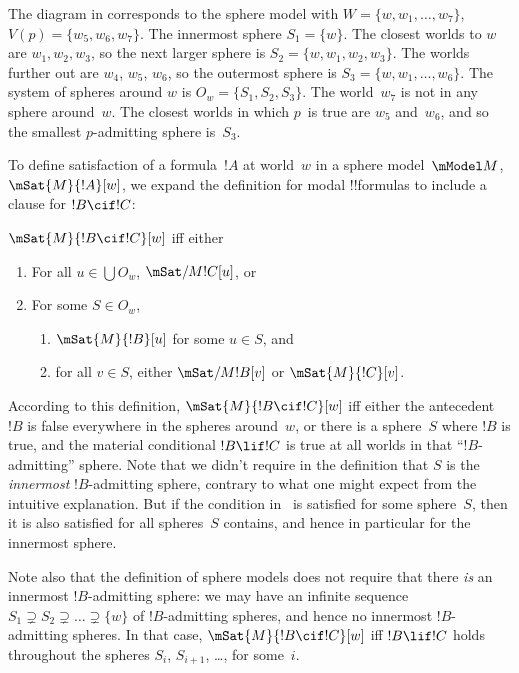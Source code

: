 \documentclass[../../../include/open-logic-section]{subfiles}
\begin{document}
The diagram in  corresponds to the sphere
model with $W = \{w, w_1, \dots, w_7\}$, $V(p) = \{w_5, w_6,
w_7\}$. The innermost sphere $S_1 = \{w\}$. The closest worlds to $w$
are $w_1, w_2, w_3$, so the next larger sphere is $S_2 = \{w, w_1,
w_2, w_3\}$. The worlds further out are $w_4$, $w_5$, $w_6$, so the
outermost sphere is $S_3 = \{w, w_1, \dots, w_6\}$. The system of
spheres around $w$ is $O_w = \{S_1, S_2, S_3\}$. The world~$w_7$ is
not in any sphere around~$w$. The closest worlds in which $p$~is true
are $w_5$ and~$w_6$, and so the smallest $p$-admitting sphere
is~$S_3$.

To define satisfaction of a formula~$!A$ at world~$w$ in a sphere
model~$\mModel M$, $\mSat{M}{!A}[w]$, we expand the definition for
modal !!{formula}s to include a clause for $!B \cif !C$:

\begin{defn}
  $\mSat{M}{!B \cif !C}[w]$ iff either
  \begin{enumerate}
  \item{} For all $u \in \bigcup O_w$, $\mSat/{M}{!C}[u]$, or
  \item{} For some $S \in O_w$,
    \begin{enumerate}
      \item $\mSat{M}{!B}[u]$ for some $u \in
        S$, and
      \item for all $v \in S$, either
        $\mSat/{M}{!B}[v]$ or $\mSat{M}{!C}[v]$.
    \end{enumerate}
  \end{enumerate}
\end{defn}

According to this definition, $\mSat{M}{!B \cif !C}[w]$ iff either the
antecedent~$!B$ is false everywhere in the spheres around~$w$, or
there is a sphere~$S$ where $!B$ is true, and the material conditional
$!B \lif !C$ is true at all worlds in that ``$!B$-admitting''
sphere. Note that we didn't require in the definition that $S$ is the
\emph{innermost} $!B$-admitting sphere, contrary to what one might
expect from the intuitive explanation. But if the condition
in~ is satisfied for some sphere~$S$, then it is
also satisfied for all spheres~$S$ contains, and hence in particular
for the innermost sphere.

Note also that the definition of sphere models does not require that
there \emph{is} an innermost $!B$-admitting sphere: we may have an
infinite sequence $S_1 \supsetneq S_2 \supsetneq \dots \supsetneq
\{w\}$ of $!B$-admitting spheres, and hence no innermost
$!B$-admitting spheres. In that case, $\mSat{M}{!B \cif !C}[w]$ iff
$!B \lif !C$ holds throughout the spheres $S_i$, $S_{i+1}$, \dots, for
some~$i$.
\end{document}
